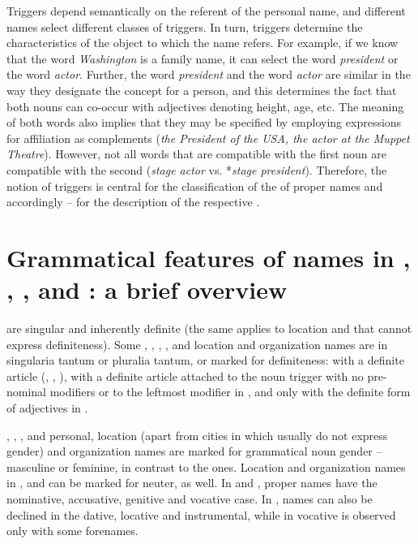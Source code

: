 \documentclass[output=paper]{langsci/langscibook}
\begin{document}
Triggers depend semantically on the referent of the personal name, and
different names select different classes of triggers. In turn, triggers
determine the characteristics of the object to which the name refers.
For example, if we know that the word \textit{Washington} is a family
name, it can select the word \textit{president} or the word
\textit{actor}. Further, the word \textit{president} and the word
\textit{actor} are similar in the way they designate the concept for a
person, and this determines the fact that both nouns can co-occur with
adjectives denoting height, age, etc. The meaning of both words also
implies that they may be specified by employing expressions for
affiliation as complements (\textit{the President of the USA, the actor
at the Muppet Theatre}). However, not all words that are compatible
with the first noun are compatible with the second (\textit{stage
actor} vs. *\textit{stage president}). Therefore, the notion of
triggers is central for the classification of the  of
proper names and accordingly – for the description of the respective
.


\section{Grammatical features of names in , , ,  and : a brief overview}

 are singular and inherently definite (the same applies to
location and  that cannot express definiteness). Some
, , , , and  location and
organization names are in singularia tantum or pluralia tantum, or
marked for definiteness: with a definite article (, ,
), with a definite article attached to the noun trigger with no
pre-nominal modifiers or to the leftmost modifier in , and
only with the definite form of adjectives in .



, , , and  personal, location (apart from
cities in  which usually do not express gender) and organization
names are marked for grammatical noun gender – masculine or feminine,
in contrast to the  ones. Location and organization names in
,  and  can be marked for neuter, as well. In
 and , proper names have the nominative, accusative,
genitive and vocative case. In , names can also be declined in
the dative, locative and instrumental, while in  vocative is
observed only with some forenames.
\end{document}
